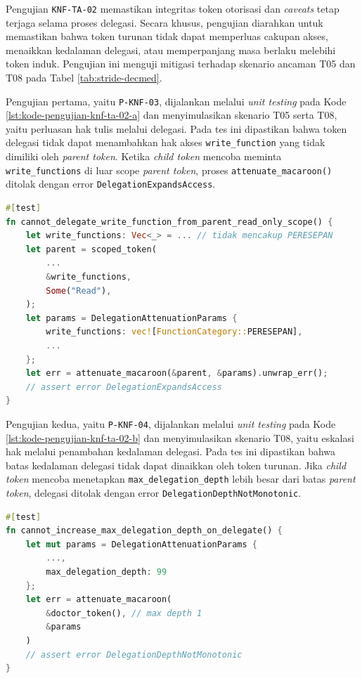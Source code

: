 \documentclass[bahasa, 12pt, a4paper, onecolumn, oneside, final]{report}
\begin{document}
Pengujian \texttt{KNF-TA-02} memastikan integritas token otorisasi dan \textit{caveats} tetap terjaga selama proses delegasi. Secara khusus, pengujian diarahkan untuk memastikan bahwa token turunan tidak dapat memperluas cakupan akses, menaikkan kedalaman delegasi, atau memperpanjang masa berlaku melebihi token induk. Pengujian ini menguji mitigasi terhadap skenario ancaman T05 dan T08 pada Tabel \ref{tab:stride-decmed}.

Pengujian pertama, yaitu \texttt{P-KNF-03}, dijalankan melalui \textit{unit testing} pada Kode \ref{lst:kode-pengujian-knf-ta-02-a} dan menyimulasikan skenario T05 serta T08, yaitu perluasan hak tulis melalui delegasi. Pada tes ini dipastikan bahwa token delegasi tidak dapat menambahkan hak akses \texttt{write\_function} yang tidak dimiliki oleh \textit{parent token}. Ketika \textit{child token} mencoba meminta \texttt{write\_functions} di luar scope \textit{parent token}, proses \texttt{attenuate\_macaroon()} ditolak dengan error \texttt{DelegationExpandsAccess}.

\begin{lstlisting}[language=Rust, caption=Pengujian P-KNF-03 untuk KNF-TA-02, label=lst:kode-pengujian-knf-ta-02-a]
#[test]
fn cannot_delegate_write_function_from_parent_read_only_scope() {
    let write_functions: Vec<_> = ... // tidak mencakup PERESEPAN
    let parent = scoped_token(
        ...
        &write_functions,
        Some("Read"),
    );
    let params = DelegationAttenuationParams {
        write_functions: vec![FunctionCategory::PERESEPAN],
        ...
    };
    let err = attenuate_macaroon(&parent, &params).unwrap_err();
	// assert error DelegationExpandsAccess
}
\end{lstlisting}

Pengujian kedua, yaitu \texttt{P-KNF-04}, dijalankan melalui \textit{unit testing} pada Kode \ref{lst:kode-pengujian-knf-ta-02-b} dan menyimulasikan skenario T08, yaitu eskalasi hak melalui penambahan kedalaman delegasi. Pada tes ini dipastikan bahwa batas kedalaman delegasi tidak dapat dinaikkan oleh token turunan. Jika \textit{child token} mencoba menetapkan \texttt{max\_delegation\_depth} lebih besar dari batas \textit{parent token}, delegasi ditolak dengan error \texttt{DelegationDepthNotMonotonic}.

\begin{lstlisting}[language=Rust, caption=Pengujian P-KNF-04 untuk KNF-TA-02, label=lst:kode-pengujian-knf-ta-02-b]
#[test]
fn cannot_increase_max_delegation_depth_on_delegate() {
    let mut params = DelegationAttenuationParams {
        ...,
        max_delegation_depth: 99
    };
    let err = attenuate_macaroon(
		&doctor_token(), // max depth 1
		&params
	)
	// assert error DelegationDepthNotMonotonic
}	
\end{lstlisting}
\end{document}
